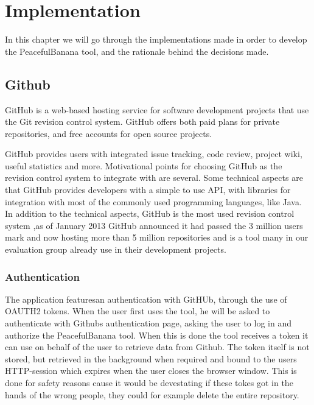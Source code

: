 \chapter{Implementation}

In this chapter we will go through the implementations made in order to develop the PeacefulBanana tool, and the rationale behind the decisions made. 

\section{Github}
\label{githubchapter}
GitHub is a web-based hosting service for software development projects that use the Git revision control system\cite{git,github}. GitHub offers both paid plans for private repositories, and free accounts for open source projects.

GitHub provides users with integrated issue tracking, code review, project wiki, useful statistics and more. 
Motivational points for choosing GitHub as the revision control system to integrate with are several. Some technical aspects are that GitHub provides developers with a simple to use API\cite{githubapi}, with libraries for integration with most of the commonly used programming languages, like Java\cite{jgit}.\\
In addition to the technical aspects, GitHub is the most used revision control system ,as of January 2013 GitHub announced it had passed the 3 million users mark and now hosting more than 5 million repositories and is a tool many in our evaluation group already use in their development projects\cite{githubnumbers}.

\subsection{Authentication}
The application featuresan authentication with GitHUb, through the use of OAUTH2 tokens. When the user first uses the tool, he will be asked to authenticate with Githubs authentication page, asking the user to log in and authorize the PeacefulBanana tool. When this is done the tool receives a token it can use on behalf of the user to retrieve data from Github. The token itself is not stored, but retrieved in the background when required and bound to the users HTTP-session which expires when the user closes the browser window. This is done for safety reasons cause it would be devestating if these tokes got in the hands of the wrong people, they could for example delete the entire repository.

